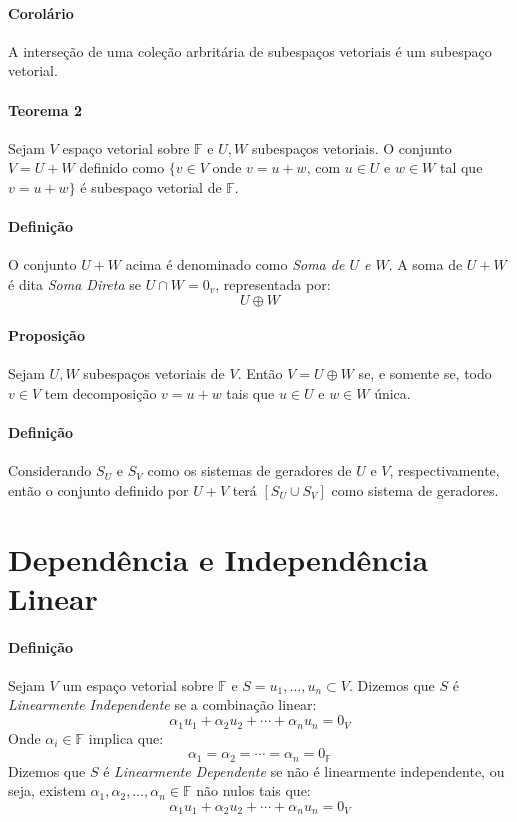 \documentclass{article}
\begin{document}
            \paragraph{Corolário}A interseção de uma coleção arbritária de subespaços vetoriais é um subespaço vetorial.

            \paragraph{Teorema 2}Sejam $V$ espaço vetorial sobre $\mathbb{F}$ e $U,W$ subespaços vetoriais. O conjunto $V = U+W$ definido como $\{v \in V$ onde $v = u + w$, com $ u\in U$ e $w\in W$ tal que $v=u+w\}$ é subespaço vetorial de $\mathbb{F}$.

            \paragraph{Definição}O conjunto $U+W$ acima é denominado como \textit{Soma de $U$ e $W$}. A soma de $U+W$ é dita \textit{Soma Direta} se $U\cap W = {0_{v}}$, representada por:
                \[\boxed{U\oplus W}\]

            \paragraph{Proposição}Sejam $U,W$ subespaços vetoriais de $V$. Então $V=U\oplus W$ se, e somente se, todo $v\in V$ tem decomposição $v=u+w$ tais que $u\in U$ e $w\in W$ única.

            \paragraph{Definição}Considerando $S_{U}$ e $S_{V}$ como os sistemas de geradores de $U$ e $V$, respectivamente, então o conjunto definido por $U+V$ terá $[S_{U}\cup S_{V}]$ como sistema de geradores.
\newpage

    \section{Dependência e Independência Linear}
        \paragraph{Definição}Sejam $V$ um espaço vetorial sobre $\mathbb{F}$ e $S={u_{1},\dots, u_{n}}\subset V$. Dizemos que $S$ é \textit{Linearmente Independente} se a combinação linear:
            \[\alpha_{1}u_{1}+\alpha_{2}u_{2}+\cdots+\alpha_{n}u_{n}=0_{V}\]
        Onde $\alpha_{i}\in\mathbb{F}$ implica que:
            \[\alpha_{1}=\alpha_{2}=\cdots=\alpha_{n}=0_{\mathbb{F}}\]
        Dizemos que $S$ é \textit{Linearmente Dependente} se não é linearmente independente, ou seja, existem $\alpha_{1},\alpha_{2},\dots,\alpha_{n}\in\mathbb{F}$ não nulos tais que:
            \[\alpha_{1}u_{1}+\alpha_{2}u_{2}+\cdots+\alpha_{n}u_{n}=0_{V}\]
        
\end{document}
